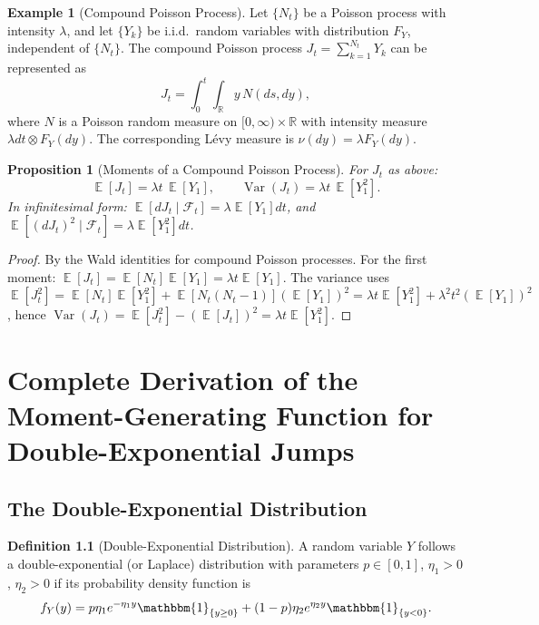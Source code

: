 \documentclass[11pt,a4paper,openany]{book}
\theoremstyle{definition}
\newtheorem{definition}{Definition}[chapter]
\newtheorem{example}[definition]{Example}
\theoremstyle{plain}
\newtheorem{proposition}[theorem]{Proposition}
\theoremstyle{remark}
\DeclareMathOperator{\E}{\mathbb{E}}
\DeclareMathOperator{\Var}{Var}
\newcommand{\1}{\mathbbm{1}}
\newcommand{\R}{\mathbb{R}}
\newcommand{\F}{\mathcal{F}}
\begin{document}
\begin{example}[Compound Poisson Process]
Let $\{N_{t}\}$ be a Poisson process with intensity $\lambda$, and let $\{Y_{k}\}$ be i.i.d.\ random variables with distribution $F_{Y}$, independent of $\{N_{t}\}$. The compound Poisson process $J_{t} = \sum_{k=1}^{N_{t}} Y_{k}$ can be represented as
\[
J_{t} = \int_{0}^{t} \int_{\R} y \, N(ds, dy),
\]
where $N$ is a Poisson random measure on $[0,\infty) \times \R$ with intensity measure $\lambda dt \otimes F_{Y}(dy)$. The corresponding L\'{e}vy measure is $\nu(dy) = \lambda F_{Y}(dy)$.
\end{example}

\begin{proposition}[Moments of a Compound Poisson Process]
For $J_{t}$ as above:
\[
\E[J_{t}] = \lambda t \, \E[Y_{1}], \qquad \Var(J_{t}) = \lambda t \, \E[Y_{1}^{2}].
\]
In infinitesimal form: $\E[dJ_{t} \mid \F_{t}] = \lambda \E[Y_{1}] dt$, and $\E[(dJ_{t})^{2} \mid \F_{t}] = \lambda \E[Y_{1}^{2}] dt$.
\end{proposition}

\begin{proof}
By the Wald identities for compound Poisson processes. For the first moment: $\E[J_{t}] = \E[N_{t}] \E[Y_{1}] = \lambda t \E[Y_{1}]$. The variance uses $\E[J_{t}^{2}] = \E[N_{t}] \E[Y_{1}^{2}] + \E[N_{t}(N_{t}-1)] (\E[Y_{1}])^{2} = \lambda t \E[Y_{1}^{2}] + \lambda^{2} t^{2} (\E[Y_{1}])^{2}$, hence $\Var(J_{t}) = \E[J_{t}^{2}] - (\E[J_{t}])^{2} = \lambda t \E[Y_{1}^{2}]$.
\end{proof}

\chapter{Complete Derivation of the Moment-Generating Function for Double-Exponential Jumps}
\label{app:dejd-mgf}

\section{The Double-Exponential Distribution}

\begin{definition}[Double-Exponential Distribution]
A random variable $Y$ follows a double-exponential (or Laplace) distribution with parameters $p \in [0,1]$, $\eta_{1} > 0$, $\eta_{2} > 0$ if its probability density function is
\[
f_{Y}(y) = p \eta_{1} e^{-\eta_{1} y} \1_{\{y \geq 0\}} + (1-p) \eta_{2} e^{\eta_{2} y} \1_{\{y < 0\}}.
\]
\end{definition}
\end{document}
